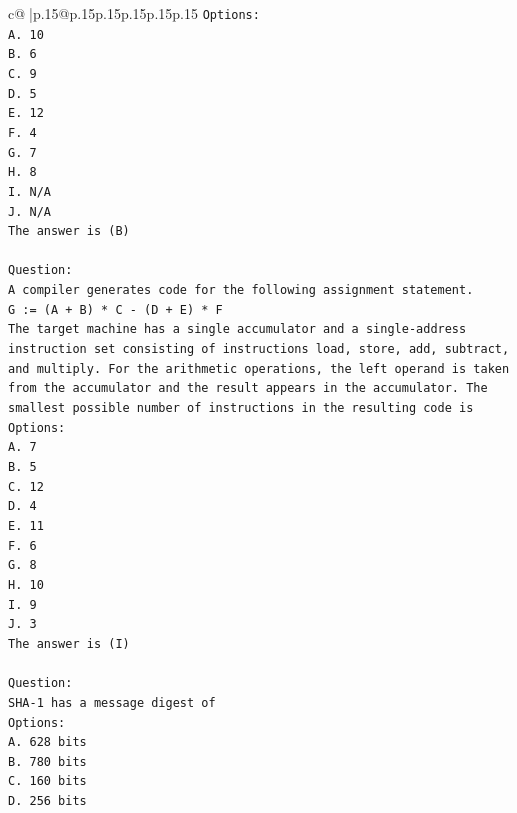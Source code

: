 \documentclass{article}
\begin{document}
{\begin{supertabular}{c@{$\;$}|p{.15\linewidth}@{}p{.15\linewidth}p{.15\linewidth}p{.15\linewidth}p{.15\linewidth}p{.15\linewidth}}
{{{\texttt{Options:} \\
\texttt{A. 10} \\
\texttt{B. 6} \\
\texttt{C. 9} \\
\texttt{D. 5} \\
\texttt{E. 12} \\
\texttt{F. 4} \\
\texttt{G. 7} \\
\texttt{H. 8} \\
\texttt{I. N/A} \\
\texttt{J. N/A} \\
\texttt{The answer is (B)} \\
\\ 
\texttt{Question:} \\
\texttt{A compiler generates code for the following assignment statement.} \\
\texttt{G := (A + B) * C {-} (D + E) * F} \\
\texttt{The target machine has a single accumulator and a single{-}address instruction set consisting of instructions load, store, add, subtract, and multiply. For the arithmetic operations, the left operand is taken from the accumulator and the result appears in the accumulator. The smallest possible number of instructions in the resulting code is} \\
\texttt{Options:} \\
\texttt{A. 7} \\
\texttt{B. 5} \\
\texttt{C. 12} \\
\texttt{D. 4} \\
\texttt{E. 11} \\
\texttt{F. 6} \\
\texttt{G. 8} \\
\texttt{H. 10} \\
\texttt{I. 9} \\
\texttt{J. 3} \\
\texttt{The answer is (I)} \\
\\ 
\texttt{Question:} \\
\texttt{SHA{-}1 has a message digest of} \\
\texttt{Options:} \\
\texttt{A. 628 bits} \\
\texttt{B. 780 bits} \\
\texttt{C. 160 bits} \\
\texttt{D. 256 bits} \\
}}}
\end{supertabular}}
\end{document}
